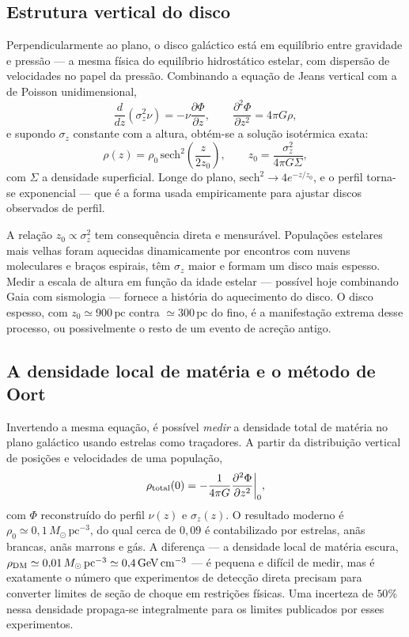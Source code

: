 \documentclass[11pt,a4paper]{article}
\begin{document}
\subsection*{Estrutura vertical do disco}

Perpendicularmente ao plano, o disco galáctico está em equilíbrio entre gravidade e pressão --- a mesma física do equilíbrio hidrostático estelar, com dispersão de velocidades no papel da pressão. Combinando a equação de Jeans vertical com a de Poisson unidimensional,
\[
\frac{d}{dz}\left(\sigma_z^{2}\nu\right)=-\nu\frac{\partial\Phi}{\partial z},
\qquad
\frac{\partial^{2}\Phi}{\partial z^{2}}=4\pi G\rho,
\]
e supondo $\sigma_z$ constante com a altura, obtém-se a solução isotérmica exata:
\[
\rho(z)=\rho_0\,\mathrm{sech}^{2}\left(\frac{z}{2z_0}\right),
\qquad
z_0=\frac{\sigma_z^{2}}{4\pi G\Sigma},
\]
com $\Sigma$ a densidade superficial. Longe do plano, $\mathrm{sech}^{2}\to4e^{-z/z_0}$, e o perfil torna-se exponencial --- que é a forma usada empiricamente para ajustar discos observados de perfil.

A relação $z_0\propto\sigma_z^{2}$ tem consequência direta e mensurável. Populações estelares mais velhas foram aquecidas dinamicamente por encontros com nuvens moleculares e braços espirais, têm $\sigma_z$ maior e formam um disco mais espesso. Medir a escala de altura em função da idade estelar --- possível hoje combinando Gaia com sismologia --- fornece a história do aquecimento do disco. O disco espesso, com $z_0\simeq900\,\mathrm{pc}$ contra $\simeq300\,\mathrm{pc}$ do fino, é a manifestação extrema desse processo, ou possivelmente o resto de um evento de acreção antigo.

\subsection*{A densidade local de matéria e o método de Oort}

Invertendo a mesma equação, é possível \emph{medir} a densidade total de matéria no plano galáctico usando estrelas como traçadores. A partir da distribuição vertical de posições e velocidades de uma população,
\[
\rho_{\rm total}(0)=-\frac{1}{4\pi G}\frac{\partial^{2}\Phi}{\partial z^{2}}\bigg|_{0},
\]
com $\Phi$ reconstruído do perfil $\nu(z)$ e $\sigma_z(z)$. O resultado moderno é $\rho_0\simeq0{,}1\,M_\odot\,\mathrm{pc^{-3}}$, do qual cerca de $0{,}09$ é contabilizado por estrelas, anãs brancas, anãs marrons e gás. A diferença --- a densidade local de matéria escura, $\rho_{\rm DM}\simeq0{,}01\,M_\odot\,\mathrm{pc^{-3}}\simeq0{,}4\,\mathrm{GeV\,cm^{-3}}$ --- é pequena e difícil de medir, mas é exatamente o número que experimentos de detecção direta precisam para converter limites de seção de choque em restrições físicas. Uma incerteza de $50\%$ nessa densidade propaga-se integralmente para os limites publicados por esses experimentos.
\end{document}
